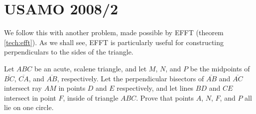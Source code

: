 \section{USAMO 2008/2}
\label{exam:2008usamo2}
We follow this with another problem, made possible by EFFT (theorem \ref{tech:efft}).  As we shall see, EFFT is particularly useful for constructing perpendiculars to the sides of the triangle.

\secps
\begin{problem}[USAMO 2008/2]
  Let $ABC$ be an acute, scalene triangle, and let $M$, $N$, and $P$ be the midpoints of $\overline{BC}$, $\overline{CA}$, and $\overline{AB}$, respectively. Let the perpendicular bisectors of $\overline{AB}$ and $\overline{AC}$ intersect ray $AM$ in points $D$ and $E$ respectively, and let lines $BD$ and $CE$ intersect in point $F$, inside of triangle $ABC$. Prove that points $A$, $N$, $F$, and $P$ all lie on one circle.
\end{problem}


